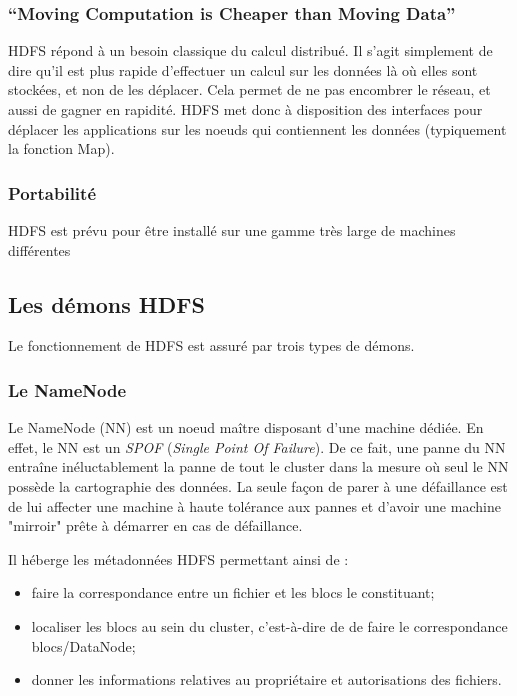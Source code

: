 \subsubsection{``Moving Computation is Cheaper than Moving Data''}
\label{sec:moving-comp-cheap}

\par HDFS répond à un besoin classique du calcul distribué. Il s'agit simplement de dire qu'il est plus rapide d'effectuer un calcul sur les données là où elles sont stockées, et non de les déplacer. Cela permet de ne pas encombrer le réseau, et aussi de gagner en rapidité. HDFS met donc à disposition des interfaces pour déplacer les applications sur les noeuds qui contiennent les données (typiquement la fonction Map).

\subsubsection{Portabilité}
\label{sec:portabilite}

\par HDFS est prévu pour être installé sur une gamme très large de machines différentes

\subsection{Les démons HDFS}

\par Le fonctionnement de HDFS est assuré par trois types de démons.

\subsubsection{Le NameNode}

\par Le NameNode (NN) est un noeud maître disposant d'une machine dédiée. En effet, le NN est un \textit{SPOF} (\textit{Single Point Of Failure}). De ce fait, une panne du NN entraîne inéluctablement la panne de tout le cluster dans la mesure où seul le NN possède la cartographie des données. La seule façon de parer à une défaillance est de lui affecter une machine à haute tolérance aux pannes et d'avoir une machine "mirroir" prête à démarrer en cas de défaillance.

\par Il héberge les métadonnées HDFS permettant ainsi de :

\smallskip

\begin{itemize}
\item faire la correspondance entre un fichier et les blocs le constituant;
\item localiser les blocs au sein du cluster, c'est-à-dire de de faire le correspondance blocs/DataNode;
\item donner les informations relatives au propriétaire et autorisations des fichiers.
\end{itemize}

